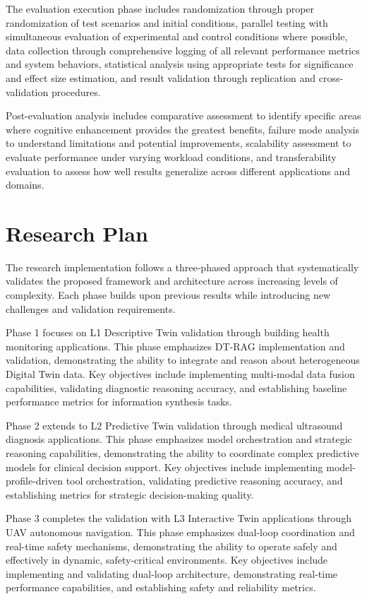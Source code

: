 The evaluation execution phase includes randomization through proper randomization of test scenarios and initial conditions, parallel testing with simultaneous evaluation of experimental and control conditions where possible, data collection through comprehensive logging of all relevant performance metrics and system behaviors, statistical analysis using appropriate tests for significance and effect size estimation, and result validation through replication and cross-validation procedures.

Post-evaluation analysis includes comparative assessment to identify specific areas where cognitive enhancement provides the greatest benefits, failure mode analysis to understand limitations and potential improvements, scalability assessment to evaluate performance under varying workload conditions, and transferability evaluation to assess how well results generalize across different applications and domains.

\section{Research Plan}

The research implementation follows a three-phased approach that systematically validates the proposed framework and architecture across increasing levels of complexity. Each phase builds upon previous results while introducing new challenges and validation requirements.

Phase 1 focuses on L1 Descriptive Twin validation through building health monitoring applications. This phase emphasizes DT-RAG implementation and validation, demonstrating the ability to integrate and reason about heterogeneous Digital Twin data. Key objectives include implementing multi-modal data fusion capabilities, validating diagnostic reasoning accuracy, and establishing baseline performance metrics for information synthesis tasks.

Phase 2 extends to L2 Predictive Twin validation through medical ultrasound diagnosis applications. This phase emphasizes model orchestration and strategic reasoning capabilities, demonstrating the ability to coordinate complex predictive models for clinical decision support. Key objectives include implementing model-profile-driven tool orchestration, validating predictive reasoning accuracy, and establishing metrics for strategic decision-making quality.

Phase 3 completes the validation with L3 Interactive Twin applications through UAV autonomous navigation. This phase emphasizes dual-loop coordination and real-time safety mechanisms, demonstrating the ability to operate safely and effectively in dynamic, safety-critical environments. Key objectives include implementing and validating dual-loop architecture, demonstrating real-time performance capabilities, and establishing safety and reliability metrics.

